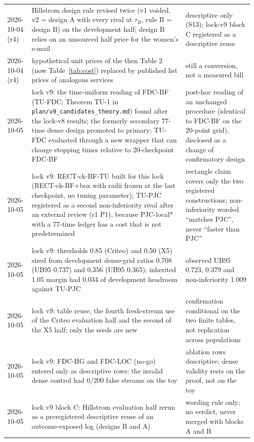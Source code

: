 \documentclass[sigconf,anonymous,review]{acmart}
\begin{document}
\begin{table}[t]
\begin{tabular}{@{}l>{\raggedright\arraybackslash}p{6.6cm}>{\raggedright\arraybackslash}p{7.6cm}@{}}
2026-10-04 (r4) & Hillstrom design rule revised twice (v1 voided, v2 = design A with every rival at $\tau_R$, rule B = design B) on the development half; design B relies on an unsourced half price for the women's e-mail & descriptive only (S13); lock-v9 block C registered as a descriptive reuse \\
2026-10-04 (r4) & hypothetical unit prices of the then Table 2 (now Table~\ref{tab:cost}) replaced by published list prices of analogous services & still a conversion, not a measured bill \\
2026-10-05 & lock v9: the time-uniform reading of FDC-BF (TU-FDC; Theorem TU-1 in \texttt{plan/v9\_candidates\_theory.md}) found after the lock-v8 results; the formerly secondary 77-time dense design promoted to primary; TU-FDC evaluated through a new wrapper that can change stopping times relative to 20-checkpoint FDC-BF & post-hoc reading of an unchanged procedure (identical to FDC-BF on the 20-point grid), disclosed as a change of confirmatory design \\
2026-10-05 & lock v9: RECT-ck-BF-TU built for this lock (RECT-ck-BF+box with radii frozen at the last checkpoint, no tuning parameter); TU-PJC registered as a second non-inferiority rival after an external review (r1 P1), because PJC-local* with a 77-time ledger has a cost that is not predetermined & rectangle claim covers only the two registered constructions; non-inferiority worded ``matches PJC'', never ``faster than PJC'' \\
2026-10-05 & lock v9: thresholds 0.85 (Criteo) and 0.50 (X5) sized from development dense-grid ratios 0.708 (UB95 0.737) and 0.356 (UB95 0.365); inherited 1.05 margin had 0.034 of development headroom against TU-PJC & observed UB95 0.723, 0.379 and non-inferiority 1.009 \\
2026-10-05 & lock v9: table reuse, the fourth fresh-stream use of the Criteo evaluation half and the second of the X5 half; only the seeds are new & confirmation conditional on the two finite tables, not replication across populations \\
2026-10-05 & lock v9: FDC-HG and FDC-LOC (no-go) entered only as descriptive rows; the invalid dense control had 0/200 false streams on the toy & ablation rows descriptive; dense validity rests on the proof, not on the toy \\
2026-10-05 & lock v9 block C: Hillstrom evaluation half rerun as a preregistered descriptive reuse of an outcome-exposed log (designs B and A) & wording rule only; no verdict, never merged with blocks A and B \\

\end{tabular}
\end{table}
\end{document}
